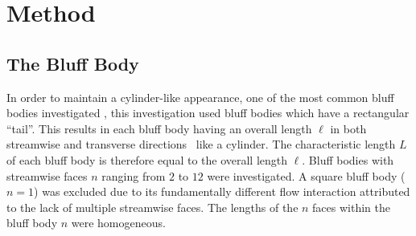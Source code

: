 \section{Method}
\subsection{The Bluff Body}
\label{sec:bluffBody}
In order to maintain a cylinder-like appearance, one of the most common bluff bodies investigated \parencite[475]{rocchi2002_vortex}, this investigation used bluff bodies which have a rectangular “tail”. This results in each bluff body having an overall length $\ell$ in both streamwise and transverse directions \textemdash\ like a cylinder. The characteristic length $L$ of each bluff body is therefore equal to the overall length $\ell$. Bluff bodies with streamwise faces $n$ ranging from $2$ to $12$ were investigated. A square bluff body ($n=1$) was excluded due to its fundamentally different flow interaction attributed to the lack of multiple streamwise faces. The lengths of the $n$ faces within the bluff body $n$ were homogeneous.
